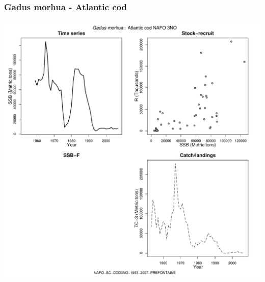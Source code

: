 \subsubsection{Gadus morhua - Atlantic cod}
\begin{center}
\includegraphics[width=1.2\textwidth]{../R/figures/NAFO-SC-COD3NO-1953-2007-PREFONTAINE.pdf}
\end{center}

